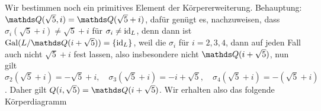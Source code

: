 Wir bestimmen noch ein primitives Element der Körpererweiterung. Behauptung: $\Q(\sqrt{5},i)=\Q(\sqrt{5}+i)$, dafür genügt es, nachzuweisen, dass $\sigma_i(\sqrt{5}+i)\neq \sqrt{5}+i$ für $\sigma_i\neq \operatorname{id}_L$, denn dann ist $\operatorname{Gal}(L/\Q(i+\sqrt{5}))=\{\id_L\}$, weil die $\sigma_i$ für $i=2,3,4$, dann auf jeden Fall auch nicht $\sqrt{5}+i$ fest lassen, also insbesondere nicht $\Q(i+\sqrt{5})$, nun gilt 
\[
\sigma_2(\sqrt{5}+i) = -\sqrt{5}+i, \quad \sigma_3(\sqrt{5}+i)=-i+\sqrt{5}, \quad \sigma_4(\sqrt{5}+i)=-(\sqrt{5}+i)    
\]. Daher gilt $Q(i,\sqrt{5})=\Q(i+\sqrt{5})$. Wir erhalten also das folgende Körperdiagramm
\begin{center}
\end{center}
